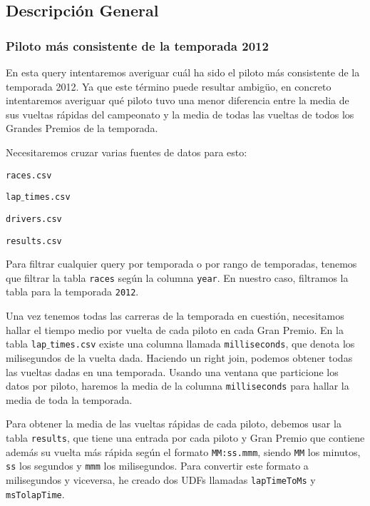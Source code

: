\documentclass[12pt,twoside,titlepage]{report}
\begin{document}
\subsection{Descripción General}

\subsubsection{Piloto más consistente de la temporada 2012}
En esta query intentaremos averiguar cuál ha sido el piloto más consistente de la temporada 2012. Ya que este término puede resultar ambigüo, en concreto intentaremos averiguar qué piloto tuvo una menor diferencia entre la media de sus vueltas rápidas del campeonato y la media de todas las vueltas de todos los Grandes Premios de la temporada.

Necesitaremos cruzar varias fuentes de datos para esto: 

\begin{compactitem}
  \item \texttt{races.csv}
  \item \texttt{lap$\_$times.csv}
  \item \texttt{drivers.csv}
  \item \texttt{results.csv}
\end{compactitem}

Para filtrar cualquier query por temporada o por rango de temporadas, tenemos que filtrar la tabla \texttt{races} según la columna \texttt{year}. En nuestro caso, filtramos la tabla para la temporada \texttt{2012}.

Una vez tenemos todas las carreras de la temporada en cuestión, necesitamos hallar el tiempo medio por vuelta de cada piloto en cada Gran Premio. En la tabla \texttt{lap$\_$times.csv} existe una columna llamada \texttt{milliseconds}, que denota los milisegundos de la vuelta dada. Haciendo un right join, podemos obtener todas las vueltas dadas en una temporada. Usando una ventana que particione los datos por piloto, haremos la media de la columna \texttt{milliseconds} para hallar la media de toda la temporada.

Para obtener la media de las vueltas rápidas de cada piloto, debemos usar la tabla \texttt{results}, que tiene una entrada por cada piloto y Gran Premio que contiene además su vuelta más rápida según el formato \texttt{MM:ss.mmm}, siendo \texttt{MM} los minutos, \texttt{ss} los segundos y \texttt{mmm} los milisegundos. Para convertir este formato a milisegundos y viceversa, he creado dos UDFs llamadas \texttt{lapTimeToMs} y \texttt{msTolapTime}.
\end{document}

